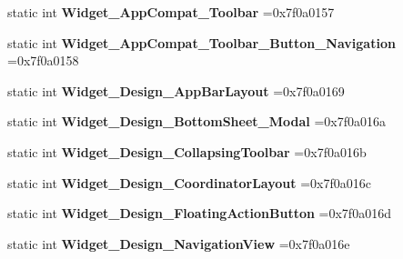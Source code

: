 \begin{DoxyCompactItemize}
static int {\bfseries Widget\+\_\+\+App\+Compat\+\_\+\+Toolbar} =0x7f0a0157
\item 
\mbox{\label{classandroid_1_1support_1_1graphics_1_1drawable_1_1R_1_1style_a5066a0570307442d2082166c526a4dd5}} 
static int {\bfseries Widget\+\_\+\+App\+Compat\+\_\+\+Toolbar\+\_\+\+Button\+\_\+\+Navigation} =0x7f0a0158
\item 
\mbox{\label{classandroid_1_1support_1_1graphics_1_1drawable_1_1R_1_1style_a5a914f562391086871cc70d36a376425}} 
static int {\bfseries Widget\+\_\+\+Design\+\_\+\+App\+Bar\+Layout} =0x7f0a0169
\item 
\mbox{\label{classandroid_1_1support_1_1graphics_1_1drawable_1_1R_1_1style_a2d86a770bdc987971ac23d34405c5375}} 
static int {\bfseries Widget\+\_\+\+Design\+\_\+\+Bottom\+Sheet\+\_\+\+Modal} =0x7f0a016a
\item 
\mbox{\label{classandroid_1_1support_1_1graphics_1_1drawable_1_1R_1_1style_ad456b03092f0a079e717a1bbfb91715b}} 
static int {\bfseries Widget\+\_\+\+Design\+\_\+\+Collapsing\+Toolbar} =0x7f0a016b
\item 
\mbox{\label{classandroid_1_1support_1_1graphics_1_1drawable_1_1R_1_1style_a16a65bb8fa6788709e5e0af31593030e}} 
static int {\bfseries Widget\+\_\+\+Design\+\_\+\+Coordinator\+Layout} =0x7f0a016c
\item 
\mbox{\label{classandroid_1_1support_1_1graphics_1_1drawable_1_1R_1_1style_a37b93ac037eee8741e6d5c794c1a5cbb}} 
static int {\bfseries Widget\+\_\+\+Design\+\_\+\+Floating\+Action\+Button} =0x7f0a016d
\item 
\mbox{\label{classandroid_1_1support_1_1graphics_1_1drawable_1_1R_1_1style_a8a13e7143c8f8a59147ca7aeeaf570cf}} 
static int {\bfseries Widget\+\_\+\+Design\+\_\+\+Navigation\+View} =0x7f0a016e
\item 

\end{DoxyCompactItemize}
